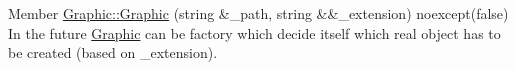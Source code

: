 
\begin{DoxyRefList}
\item[Member \mbox{\hyperlink{class_graphic_ab669d3afceb0a91436a00df7c24bf313}{Graphic\+::Graphic}} (string \&\+\_\+path, string \&\&\+\_\+extension) noexcept(false)]\label{todo__todo000001}%
%
In the future \mbox{\hyperlink{class_graphic}{Graphic}} can be factory which decide itself which real object has to be created (based on \+\_\+extension). 
\end{DoxyRefList}
